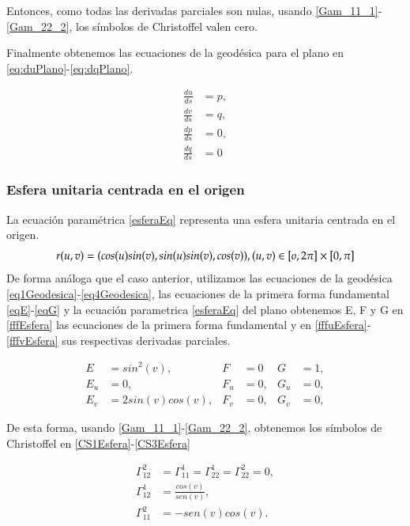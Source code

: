 \documentclass{endm}
\begin{document}
Entonces, como todas las derivadas parciales son nulas, usando \ref{Gam_11_1}-\ref{Gam_22_2}, los s\'imbolos de Christoffel valen cero.

Finalmente obtenemos las ecuaciones de la geod\'esica para el plano en \ref{eq:duPlano}-\ref{eq:dqPlano}.

\begin{align}
\frac{du}{ds}&=p,\label{eq:duPlano} \\
\frac{dv}{ds}&=q,\label{eq:dvPlano}     \\
\frac{dp}{ds}&=0, \label{eq:dpPlano}\\ 
\frac{dq}{ds}&=0 \label{eq:dqPlano}
\end{align}

\subsubsection{Esfera unitaria centrada en el origen}

La ecuaci\'on param\'etrica \ref{esferaEq} representa una esfera unitaria centrada en el origen.
\begin{equation} \label{esferaEq}
r(u,v) = (cos (u) sin(v), sin (u) sin (v),cos (v)), \\
(u,v) \in  [o, 2 \pi] \times [0, \pi]
\end{equation}
De forma an\'aloga que el caso anterior, utilizamos las ecuaciones de la geod\'esica \ref{eq1Geodesica}-\ref{eq4Geodesica}, las ecuaciones de la primera forma fundamental \ref{eqE}-\ref{eqG} y la ecuaci\'on parametrica \ref{esferaEq} del plano obtenemos E, F y G en \ref{fffEsfera} las ecuaciones de la primera forma fundamental y en \ref{fffuEsfera}-\ref{fffvEsfera} sus respectivas derivadas parciales.

\begin{align}
E&=sin^2 (v),   & F &=0    & G&=1, \label{fffEsfera} \\
E_u&=0,     & F_u&=0,   & G_u&=0, \label{fffuEsfera}\\
E_v&=2sin(v)cos(v),    & F_v&=0,   & G_v&=0, \label{fffvEsfera}
\end{align}

De esta forma, usando \ref{Gam_11_1}-\ref{Gam_22_2}, obtenemos los s\'imbolos de Christoffel en \ref{CS1Esfera}-\ref{CS3Esfera}

\begin{align}
\Gamma_{12}^2&=\Gamma_{11}^1=\Gamma_{22}^1=\Gamma_{22}^2=0, \label{CS1Esfera} \\
\Gamma_{12}^1&=\frac{cos(v)}{sen(v)},  \label{CS2Esfera}   \\
\Gamma_{11}^2&=-sen(v)cos(v) .  \label{CS3Esfera}
\end{align}
\end{document}
